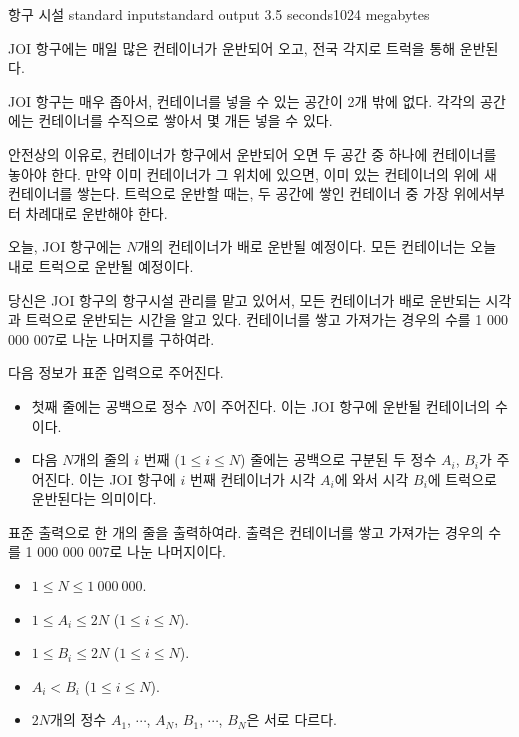 \begin{problem}{항구 시설}
	{standard input}{standard output}
	{3.5 seconds}{1024 megabytes}{}
	
	JOI 항구에는 매일 많은 컨테이너가 운반되어 오고, 전국 각지로 트럭을 통해 운반된다.
	
	JOI 항구는 매우 좁아서, 컨테이너를 넣을 수 있는 공간이 2개 밖에 없다. 각각의 공간에는 컨테이너를 수직으로 쌓아서 몇 개든 넣을 수 있다.
	
	안전상의 이유로, 컨테이너가 항구에서 운반되어 오면 두 공간 중 하나에 컨테이너를 놓아야 한다. 만약 이미 컨테이너가 그 위치에 있으면, 이미 있는 컨테이너의 위에 새 컨테이너를 쌓는다. 트럭으로 운반할 때는, 두 공간에 쌓인 컨테이너 중 가장 위에서부터 차례대로 운반해야 한다.
	
	오늘, JOI 항구에는 $N$개의 컨테이너가 배로 운반될 예정이다. 모든 컨테이너는 오늘 내로 트럭으로 운반될 예정이다.
	
	당신은 JOI 항구의 항구시설 관리를 맡고 있어서, 모든 컨테이너가 배로 운반되는 시각과 트럭으로 운반되는 시간을 알고 있다. 컨테이너를 쌓고 가져가는 경우의 수를 1 000 000 007로 나눈 나머지를 구하여라.
	
	\InputFile

다음 정보가 표준 입력으로 주어진다.

\begin{itemize}
	\item 첫째 줄에는 공백으로 정수 $N$이 주어진다. 이는 JOI 항구에 운반될 컨테이너의 수이다.
	\item 다음 $N$개의 줄의 $i$ 번째 ($1 \le i \le N$) 줄에는 공백으로 구분된 두 정수 $A_i$, $B_i$가 주어진다. 이는 JOI 항구에 $i$ 번째 컨테이너가 시각 $A_i$에 와서 시각 $B_i$에 트럭으로 운반된다는 의미이다.
\end{itemize}


\OutputFile

표준 출력으로 한 개의 줄을 출력하여라. 출력은 컨테이너를 쌓고 가져가는 경우의 수를 1 000 000 007로 나눈 나머지이다.

\Constraints

\begin{itemize}
	
	\item $1 \le N \le 1\ 000\ 000$.
	\item $1 \le A_i \le 2N$ ($1 \le i \le N$).
	\item $1 \le B_i \le 2N$ ($1 \le i \le N$).
	\item $A_i < B_i$ ($1 \le i \le N$).
	\item $2N$개의 정수 $A_1$, $\cdots$, $A_N$, $B_1$, $\cdots$, $B_N$은 서로 다르다.	
\end{itemize}



\end{problem}
